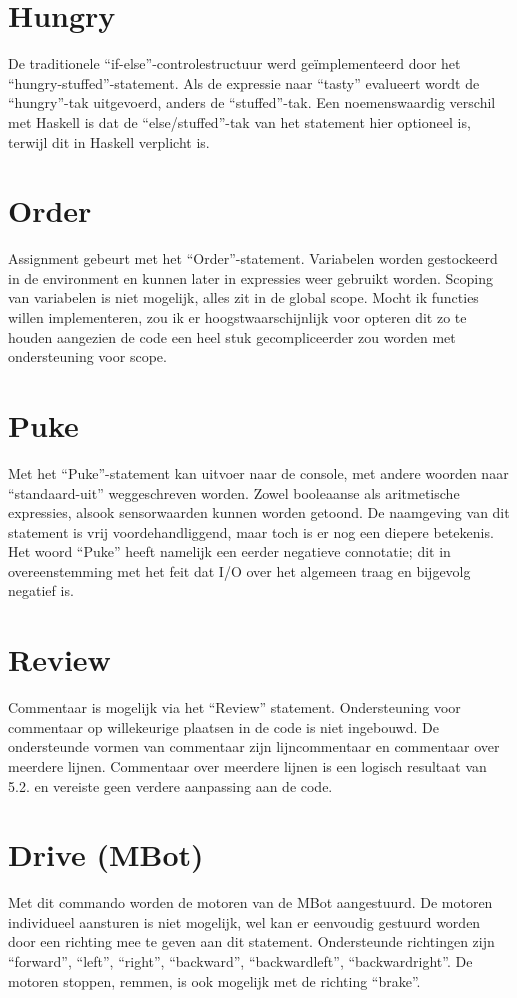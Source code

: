 \documentclass[12pt,a4paper]{report}
\begin{document}
\section{Hungry}
De traditionele ``if-else''-controlestructuur werd geïmplementeerd door het ``hungry-stuffed''-statement. Als de expressie naar ``tasty'' evalueert wordt de ``hungry''-tak uitgevoerd, anders de ``stuffed''-tak. Een noemenswaardig verschil met Haskell is dat de ``else/stuffed''-tak van het statement hier optioneel is, terwijl dit in Haskell verplicht is.

\section{Order}
Assignment gebeurt met het ``Order''-statement. Variabelen worden gestockeerd in de environment en kunnen later in expressies weer gebruikt worden. Scoping van variabelen is niet mogelijk, alles zit in de global scope. Mocht ik functies willen implementeren, zou ik er hoogstwaarschijnlijk voor opteren dit zo te houden aangezien de code een heel stuk gecompliceerder zou worden met ondersteuning voor scope.

\section{Puke}
Met het ``Puke''-statement kan uitvoer naar de console, met andere woorden naar ``standaard-uit'' weggeschreven worden. Zowel booleaanse als aritmetische expressies, alsook sensorwaarden kunnen worden getoond. De naamgeving van dit statement is vrij voordehandliggend, maar toch is er nog een diepere betekenis. Het woord ``Puke'' heeft namelijk een eerder negatieve connotatie; dit in overeenstemming met het feit dat I/O over het algemeen traag en bijgevolg negatief is.

\section{Review}
Commentaar is mogelijk via het ``Review'' statement. Ondersteuning voor commentaar op willekeurige plaatsen in de code is niet ingebouwd. De ondersteunde vormen van commentaar zijn lijncommentaar en commentaar over meerdere lijnen. Commentaar over meerdere lijnen is een logisch resultaat van \textsc{5.2.} en vereiste geen verdere aanpassing aan de code.

\section{Drive (MBot)}
Met dit commando worden de motoren van de MBot aangestuurd. De motoren individueel aansturen is niet mogelijk, wel kan er eenvoudig gestuurd worden door een richting mee te geven aan dit statement. Ondersteunde richtingen zijn ``forward'', ``left'', ``right'', ``backward'', ``backwardleft'', ``backwardright''. De motoren stoppen, remmen, is ook mogelijk met de richting ``brake''.
\end{document}

